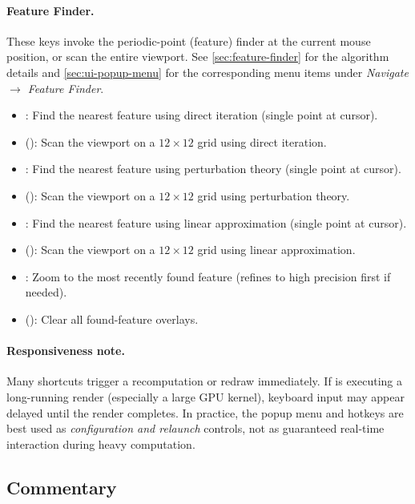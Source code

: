 \paragraph{Feature Finder.}
These keys invoke the periodic-point (feature) finder at the current mouse
position, or scan the entire viewport.  See \cref{sec:feature-finder}
for the algorithm details and \cref{sec:ui-popup-menu} for the
corresponding menu items under \emph{Navigate $\to$ Feature Finder}.
\begin{itemize}
  \item {}: Find the nearest feature using direct iteration (single point at cursor).
  \item {} (): Scan the viewport on a $12\times12$ grid using direct iteration.
  \item {}: Find the nearest feature using perturbation theory (single point at cursor).
  \item {} (): Scan the viewport on a $12\times12$ grid using perturbation theory.
  \item \code{,}: Find the nearest feature using linear approximation (single point at cursor).
  \item \code{<} (): Scan the viewport on a $12\times12$ grid using linear approximation.
  \item {}: Zoom to the most recently found feature (refines to high precision first if needed).
  \item \code{>} (): Clear all found-feature overlays.
\end{itemize}

\paragraph{Responsiveness note.}
Many shortcuts trigger a recomputation or redraw immediately.  If \FractalShark{}
is executing a long-running render (especially a large GPU kernel), keyboard
input may appear delayed until the render completes.  In practice, the popup
menu and hotkeys are best used as \emph{configuration and relaunch} controls,
not as guaranteed real-time interaction during heavy computation.

\subsection{Commentary}

